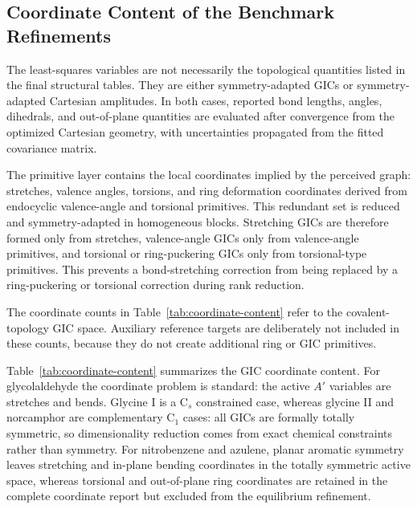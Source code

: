 \documentclass[journal=jctcce,manuscript=article,maxauthors=999]{achemso}
\begin{document}
\subsection{Coordinate Content of the Benchmark Refinements}

The least-squares variables are not necessarily the topological quantities
listed in the final structural tables. They are either symmetry-adapted GICs or
symmetry-adapted Cartesian amplitudes. In both cases, reported bond lengths,
angles, dihedrals, and out-of-plane quantities are evaluated after convergence
from the optimized Cartesian geometry, with uncertainties propagated from the
fitted covariance matrix.

The primitive layer contains the local coordinates implied by the perceived
graph: stretches, valence angles, torsions, and ring deformation coordinates
derived from endocyclic valence-angle and torsional primitives. This redundant
set is reduced and symmetry-adapted in homogeneous blocks. Stretching GICs are
therefore formed only from stretches, valence-angle GICs only from
valence-angle primitives, and torsional or ring-puckering GICs only from
torsional-type primitives. This prevents a bond-stretching correction from
being replaced by a ring-puckering or torsional correction during rank
reduction.

The coordinate counts in Table~\ref{tab:coordinate-content} refer to the
covalent-topology GIC space. Auxiliary reference targets are deliberately not
included in these counts, because they do not create additional ring or GIC
primitives.

Table~\ref{tab:coordinate-content} summarizes the GIC coordinate content. For
glycolaldehyde the coordinate problem is standard: the active $A'$ variables
are stretches and bends. Glycine I is a C$_s$ constrained case, whereas
glycine II and norcamphor are complementary C$_1$ cases: all GICs are
formally totally symmetric, so dimensionality reduction comes from exact
chemical constraints rather than symmetry. For nitrobenzene and azulene,
planar aromatic symmetry leaves stretching and in-plane bending
coordinates in the totally symmetric active space, whereas torsional and
out-of-plane ring coordinates are retained in the complete coordinate report
but excluded from the equilibrium refinement.
\end{document}
